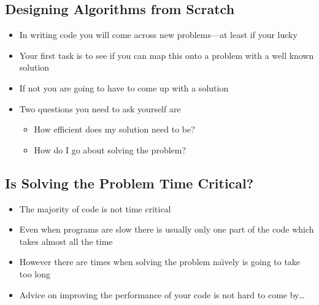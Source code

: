\begin{slide}
\section{Designing Algorithms from Scratch}

\begin{PauseHighLight}
  \begin{itemize}
  \item In writing code you will come across new problems\pause---at
    least if your lucky\pauseb
  \item Your first task is to see if you can map this onto a problem
    with a well known solution\pause
  \item If not you are going to have to come up with a solution\pause
  \item Two questions you need to ask yourself are
    \begin{itemize}
    \item How efficient does my solution need to be?\pause
    \item How do I go about solving the problem?\pause
    \end{itemize}
  \end{itemize}
\end{PauseHighLight}

\end{slide}


\begin{slide}
\section{Is Solving the Problem Time Critical?}

\begin{PauseHighLight}
  \begin{itemize}
  \item The majority of code is not time critical\pause
  \item Even when programs are slow there is usually only one part of the
    code which takes almost all the time\pause
  \item However there are times when solving the problem na\"{\i}vely is going to
    take too long\pause
  \item Advice on improving the performance of your code is not hard to
    come by\ldots\pause
  \end{itemize}
\end{PauseHighLight}

\end{slide}


